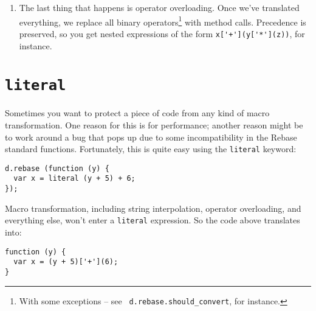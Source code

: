 \documentclass{report}
\begin{document}
\begin{enumerate}
\begin{verbatim}
var s = 'The number is #{3 + 5}';
\end{verbatim}

          \noindent is expanded into:

\begin{verbatim}
var s = ('The number is ' + (3 + 5) + '');
\end{verbatim}

          Code inside these escapes is rebased, so you can also say things like this:

\begin{verbatim}
var s = 'The number is #{(x >$> x + 1) (5)}';
\end{verbatim}

          Strings without these sequences are left alone. This is necessary to preserve the integrity of hash-keys, which must be unparenthesized literal strings or identifiers.

\item The last thing that happens is operator overloading. Once we've translated everything, we replace all binary operators\footnote{With some exceptions -- see {\tt
          d.rebase.should\_convert}, for instance.} with method calls. Precedence is preserved, so you get nested expressions of the form \verb|x['+'](y['*'](z))|, for instance.
\end{enumerate}

\section {{\tt literal}}
      Sometimes you want to protect a piece of code from any kind of macro transformation. One reason for this is for performance; another reason might be to work around a bug that pops up due
      to some incompatibility in the Rebase standard functions. Fortunately, this is quite easy using the \verb|literal| keyword:

\begin{verbatim}
d.rebase (function (y) {
  var x = literal (y + 5) + 6;
});
\end{verbatim}

      Macro transformation, including string interpolation, operator overloading, and everything else, won't enter a \verb|literal| expression. So the code above translates into:

\begin{verbatim}
function (y) {
  var x = (y + 5)['+'](6);
}
\end{verbatim}
\end{document}
